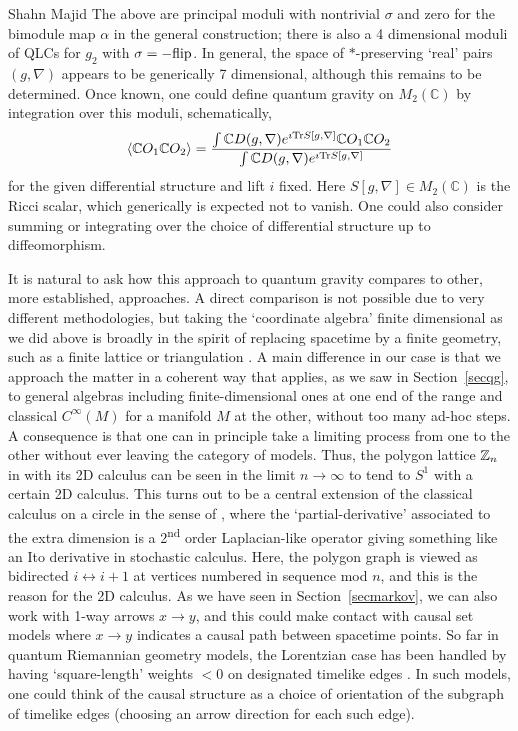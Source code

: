 \begin{artengenv}{Shahn Majid}
The above are principal moduli with nontrivial $\sigma$ and zero for the bimodule map $\alpha$ in the general construction; there is also a 4 dimensional moduli of QLCs for $g_2$ with $\sigma=-{\rm flip}$. In general, the space of $*$-preserving `real' pairs $(g,\nabla)$ appears to be generically 7 dimensional, although this remains to be determined. Once known, one could define quantum gravity on $M_2(\mathbb{C})$ by integration over this moduli, schematically,
\[ \langle\mathbb{C}O_1\mathbb{C}O_2\rangle={\int\mathbb{C}D(g,\nabla) e^{\imath {\rm Tr} S[g,\nabla]}\mathbb{C}O_1\mathbb{C}O_2\over \int \mathbb{C}D(g,\nabla)e^{\imath {\rm Tr} S[g,\nabla]} } \]
for the given differential structure and lift $i$ fixed. Here $S[g,\nabla]\in M_2(\mathbb{C})$ is the Ricci scalar, which generically is expected not to vanish. One could also consider summing or integrating over the choice of differential structure up to diffeomorphism. 

It is natural to ask how this approach to quantum gravity compares to other, more established, approaches. A direct comparison is not possible due to very different methodologies, but taking the `coordinate algebra' finite dimensional as we did above is broadly in the spirit of replacing spacetime by a finite geometry, such as a finite lattice or triangulation \parencite{AJL}. A main difference in our case is that we approach the matter in a coherent way that applies, as we saw in Section~\ref{secqg}, to general algebras including finite-dimensional ones at one end of the range and classical $C^\infty(M)$ for a manifold $M$ at the other, without too many ad-hoc steps. A consequence is that one can in principle take a limiting process from one to the other without ever leaving the category of models. Thus, the polygon lattice ${\mathbb{Z}}_n$ in \parencite{ArgMa} with its 2D calculus can be seen in the limit $n\to\infty$ to tend to $S^1$ with a certain 2D calculus. This turns out to be a central extension of the classical calculus on a circle in the sense of \parencites{Ma:rec}[Chapter~8.3]{BegMa}, where the `partial-derivative' associated to the extra dimension is a 2\textsuperscript{nd} order Laplacian-like operator giving something like an Ito derivative in stochastic calculus. Here, the polygon graph is viewed as bidirected $i\leftrightarrow i+1$ at vertices numbered in sequence mod $n$, and this is the reason for the 2D calculus. As we have seen in Section~\ref{secmarkov}, we can also work with 1-way arrows $x\to y$, and this could make contact with causal set models \parencite{Dow} where $x\to y$ indicates a causal path between spacetime points. So far in quantum Riemannian geometry models, the Lorentzian case has been handled by having `square-length' weights $<0$ on designated timelike edges \parencite{Ma:squ}. In such models, one could think of the causal structure as a choice of orientation of the subgraph of timelike edges (choosing an arrow direction for each such edge).


\end{artengenv}
